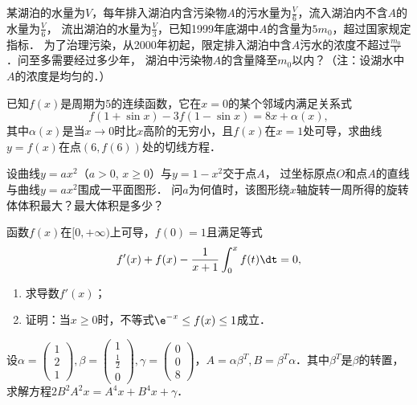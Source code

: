 \documentclass[plain,noanswer,medmath]{../../template/jnuexam}
\begin{document}

\begin{problem}
某湖泊的水量为$V$，每年排入湖泊内含污染物$A$的污水量为$\frac{V}{6}$，流入湖泊内不含$A$的水量为$\frac{V}{6}$，
流出湖泊的水量为$\frac{V}{3}$，已知1999年底湖中$A$的含量为$5m_0$，超过国家规定指标．
为了治理污染，从2000年初起，限定排入湖泊中含$A$污水的浓度不超过$\frac{m_0}{V}$．问至多需要经过多少年，
湖泊中污染物$A$的含量降至$m_0$以内？（注：设湖水中$A$的浓度是均匀的．）
\end{problem}






\begin{problem}
已知$f(x)$是周期为$5$的连续函数，它在$x = 0$的某个邻域内满足关系式
$$f(1 + \sin x) - 3f(1 - \sin x) = 8x + \alpha(x),$$
其中$\alpha (x)$是当$x \to 0$时比$x$高阶的无穷小，且$f(x)$在$x = 1$处可导，求曲线$y = f(x)$在点$(6,f(6))$处的切线方程．
\end{problem}



\begin{problem}
设曲线$y = ax^2$（$a > 0$, $x \ge 0$）与$y = 1 - x^2$交于点$A$，
过坐标原点$O$和点$A$的直线与曲线$y = ax^2$围成一平面图形．
问$a$为何值时，该图形绕$x$轴旋转一周所得的旋转体体积最大？最大体积是多少？
\end{problem}



\begin{problem}
函数$f(x)$在$[0, +\infty)$上可导，$f(0) = 1$且满足等式
$$f'(x) + f(x) - \frac{1}{x + 1}\int_0^x f(t)\dt = 0,$$
\begin{enumerate}
\item 求导数$f'(x)$；
\item 证明：当$x \ge 0$时，不等式$\e^{- x} \le f(x) \le 1$成立．
\end{enumerate}
\end{problem}



\begin{problem}
设$\alpha = \begin{pmatrix}
  1 \\
  2 \\
  1
\end{pmatrix},\beta = \begin{pmatrix}
  1 \\
  \frac{1}{2} \\
  0
\end{pmatrix},\gamma = \begin{pmatrix}
  0 \\
  0 \\
  8
\end{pmatrix}$，$A = \alpha \beta^T,B = \beta^T\alpha$．其中$\beta^T$是$\beta$的转置，
求解方程$2B^2A^2 x = A^4 x + B^4 x + \gamma$．
\end{problem}
\end{document}
